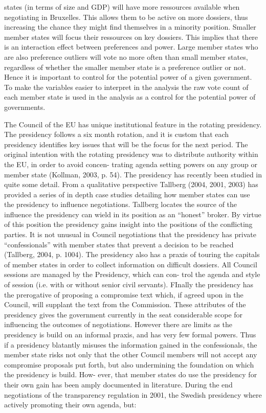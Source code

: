 states (in terms of size and GDP) will have more ressources available when negotiating in Bruxelles. This allows them to be active on more dossiers, thus increasing the chance they might find themselves in a minority position. Smaller member states will focus their ressources on key dossiers. This implies that there is an interaction effect between preferences and power. Large member states who are also preference outliers will vote no more often than small member states, regardless of whether the smaller member state is a preference outlier or not. Hence it is important to control for the potential power of a given government. To make the variables easier to interpret in the analysis the raw vote count of each member state is used in the analysis as a control for the potential power of governments.

The Council of the EU has unique institutional feature in the rotating presidency. The presidency follows a six month rotation, and it is custom that each presidency identifies key issues that will be the focus for the next period. The original intention with the rotating presidency was to distribute authority within the EU, in order to avoid concen- trating agenda setting powers on any group or member state (Kollman, 2003, p. 54). The presidency has recently been studied in quite some detail. From a qualitative perspective Tallberg (2004, 2001, 2003) has provided a series of in depth case studies detailing how member states can use the presidency to influence negotiations. Tallberg locates the source of the influence the presidency can wield in its position as an “honest” broker. By virtue of this position the presidency gains insight into the positions of the conflicting parties. It is not unusual in Council negotiations that the presidency has private “confessionals” with member states that prevent a decision to be reached (Tallberg, 2004, p. 1004). The presidency also has a praxis of touring the capitals of member states in order to collect information on difficult dossiers. All Council sessions are managed by the Presidency, which can con- trol the agenda and style of session (i.e. with or without senior civil servants). FInally the presidency has the prerogative of proposing a compromise text which, if agreed upon in the Council, will supplant the text from the Commission. These attributes of the presidency gives the government currently in the seat considerable scope for influencing the outcomes of negotiations. However there are limits as the presidency is build on an informal praxis, and has very few formal powers. Thus if a presidency blatantly misuses the information gained in the confessionals, the member state risks not only that the other Council members will not accept any compromise proposals put forth, but also undermining the foundation on which the presidency is build. How- ever, that member states do use the presidency for their own gain has been amply documented in literature. During the end negotiations of the transparency regulation in 2001, the Swedish presidency where actively promoting their own agenda, but:

